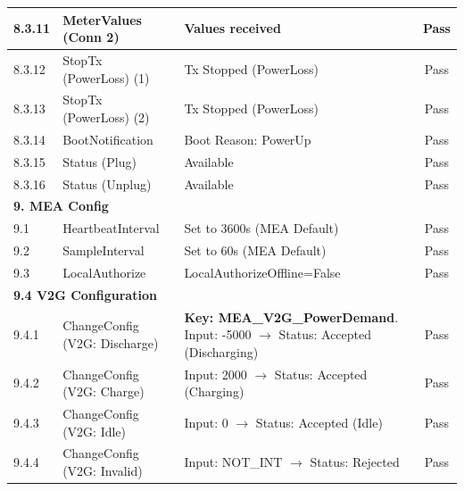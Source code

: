 \documentclass[a4paper,11pt]{report}
\begin{document}
\begin{footnotesize}
\begin{footnotesize}
\begin{longtable}{|p{1.0cm}|p{4.5cm}|p{6.5cm}|c|}
\hline
8.3.11 & MeterValues (Conn 2) & Values received & Pass \\
\hline
8.3.12 & StopTx (PowerLoss) (1) & Tx Stopped (PowerLoss) & Pass \\
\hline
8.3.13 & StopTx (PowerLoss) (2) & Tx Stopped (PowerLoss) & Pass \\
\hline
8.3.14 & BootNotification & Boot Reason: PowerUp & Pass \\
\hline
8.3.15 & Status (Plug) & Available & Pass \\
\hline
8.3.16 & Status (Unplug) & Available & Pass \\
\hline

\multicolumn{4}{|l|}{\textbf{9. MEA Config}} \\
\hline
9.1 & HeartbeatInterval & Set to 3600s (MEA Default) & Pass \\
\hline
9.2 & SampleInterval & Set to 60s (MEA Default) & Pass \\
\hline
9.3 & LocalAuthorize & LocalAuthorizeOffline=False & Pass \\
\hline
\multicolumn{4}{|l|}{\textbf{9.4 V2G Configuration}} \\
\hline
9.4.1 & ChangeConfig (V2G: Discharge) & \textbf{Key: MEA\_V2G\_PowerDemand}. Input: -5000 $\to$ Status: Accepted (Discharging) & Pass \\
\hline
9.4.2 & ChangeConfig (V2G: Charge) & Input: 2000 $\to$ Status: Accepted (Charging) & Pass \\
\hline
9.4.3 & ChangeConfig (V2G: Idle) & Input: 0 $\to$ Status: Accepted (Idle) & Pass \\
\hline
9.4.4 & ChangeConfig (V2G: Invalid) & Input: NOT\_INT $\to$ Status: Rejected & Pass \\
\hline


\end{longtable}
\end{footnotesize}
\end{footnotesize}
\end{document}
